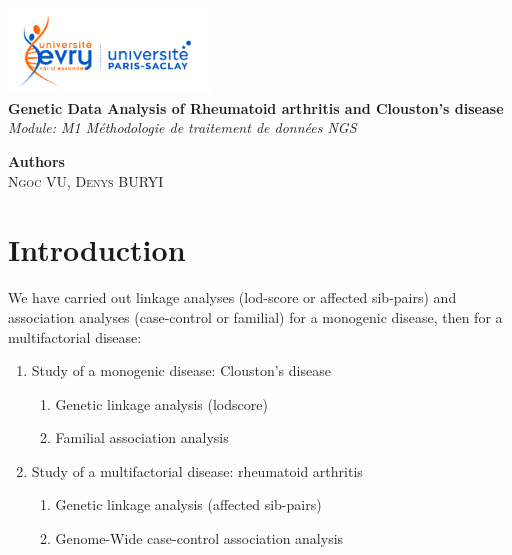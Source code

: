\documentclass[a4paper,12pt]{article}
\begin{document}
\begin{titlepage}
    \begin{center}
        \includegraphics[width=0.4\textwidth]{images/uni_logo.jpg} \\[1cm] %
        {\Large \textbf{Genetic Data Analysis of Rheumatoid arthritis and Clouston's disease}} \\[1cm] %
        \textit{Module: M1 Méthodologie de traitement de données NGS} \\[3cm] %

        \vfill %

        \textbf{Authors} \\[0.5cm]
        \textsc{Ngoc VU, Denys BURYI}


    \end{center}
\end{titlepage}

\newpage


\section*{Introduction}

We have carried out linkage analyses (lod-score or affected sib-pairs) 
and association analyses (case-control or familial) for a monogenic disease, then for a multifactorial disease:
\begin{enumerate}
    \item Study of a monogenic disease: Clouston's disease
    \begin{enumerate}
        \item Genetic linkage analysis (lodscore)
        \item Familial association analysis
    \end{enumerate}
    \item Study of a multifactorial disease: rheumatoid arthritis
    \begin{enumerate}
        \item Genetic linkage analysis (affected sib-pairs)
        \item Genome-Wide case-control association analysis
    \end{enumerate}
\end{enumerate}
\end{document}
